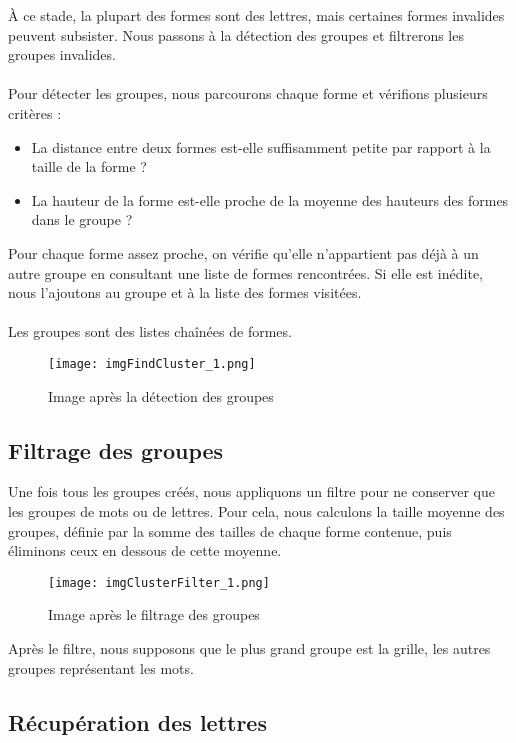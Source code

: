 \documentclass{article}
\begin{document}
À ce stade, la plupart des formes sont des lettres, mais certaines formes invalides peuvent subsister. Nous passons à la détection des groupes et filtrerons les groupes invalides.
\\\\
Pour détecter les groupes, nous parcourons chaque forme et vérifions plusieurs critères :
\begin{itemize}
    \item La distance entre deux formes est-elle suffisamment petite par rapport à la taille de la forme ?
    \item La hauteur de la forme est-elle proche de la moyenne des hauteurs des formes dans le groupe ?
\end{itemize}
\vspace{0.5cm}
Pour chaque forme assez proche, on vérifie qu'elle n'appartient pas déjà à un autre groupe en consultant une liste de formes rencontrées. Si elle est inédite, nous l’ajoutons au groupe et à la liste des formes visitées.
\\\\
Les groupes sont des listes chaînées de formes.

\begin{figure}[H]
    \centering
    \texttt{[image: imgFindCluster\_1.png]}
    \caption{Image après la détection des groupes}
\end{figure}

\subsection{Filtrage des groupes}

Une fois tous les groupes créés, nous appliquons un filtre pour ne conserver que les groupes de mots ou de lettres. Pour cela, nous calculons la taille moyenne des groupes, définie par la somme des tailles de chaque forme contenue, puis éliminons ceux en dessous de cette moyenne.

\begin{figure}[H]
    \centering
    \texttt{[image: imgClusterFilter\_1.png]}
    \caption{Image après le filtrage des groupes}
\end{figure}

Après le filtre, nous supposons que le plus grand groupe est la grille, les autres groupes représentant les mots.

\subsection{Récupération des lettres}
\end{document}
